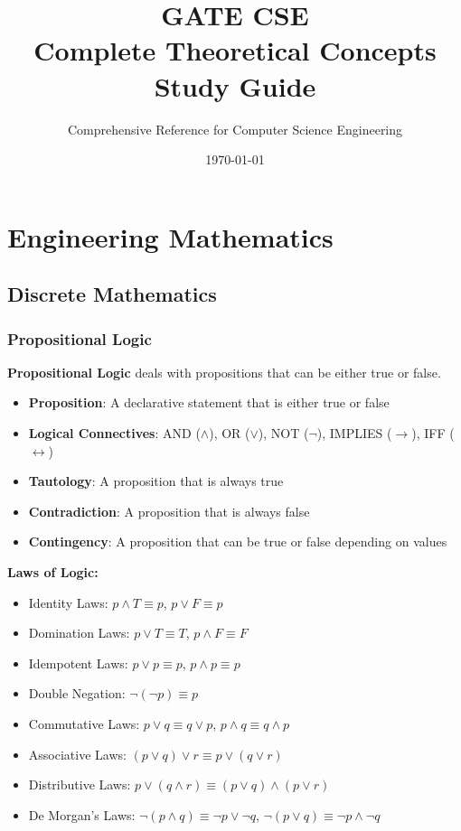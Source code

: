 \documentclass[12pt,a4paper]{report}
\title{\Huge\textbf{GATE CSE}\\\LARGE Complete Theoretical Concepts\\Study Guide}
\author{Comprehensive Reference for Computer Science Engineering}
\date{\today}
\begin{document}
\maketitle

\tableofcontents

\chapter{Engineering Mathematics}

\section{Discrete Mathematics}

\subsection{Propositional Logic}
\begin{concept}
\textbf{Propositional Logic} deals with propositions that can be either true or false.
\begin{itemize}
    \item \textbf{Proposition}: A declarative statement that is either true or false
    \item \textbf{Logical Connectives}: AND ($\land$), OR ($\lor$), NOT ($\neg$), IMPLIES ($\rightarrow$), IFF ($\leftrightarrow$)
    \item \textbf{Tautology}: A proposition that is always true
    \item \textbf{Contradiction}: A proposition that is always false
    \item \textbf{Contingency}: A proposition that can be true or false depending on values
\end{itemize}
\end{concept}

\textbf{Laws of Logic:}
\begin{itemize}
    \item Identity Laws: $p \land T \equiv p$, $p \lor F \equiv p$
    \item Domination Laws: $p \lor T \equiv T$, $p \land F \equiv F$
    \item Idempotent Laws: $p \lor p \equiv p$, $p \land p \equiv p$
    \item Double Negation: $\neg(\neg p) \equiv p$
    \item Commutative Laws: $p \lor q \equiv q \lor p$, $p \land q \equiv q \land p$
    \item Associative Laws: $(p \lor q) \lor r \equiv p \lor (q \lor r)$
    \item Distributive Laws: $p \lor (q \land r) \equiv (p \lor q) \land (p \lor r)$
    \item De Morgan's Laws: $\neg(p \land q) \equiv \neg p \lor \neg q$, $\neg(p \lor q) \equiv \neg p \land \neg q$
\end{itemize}
\end{document}
